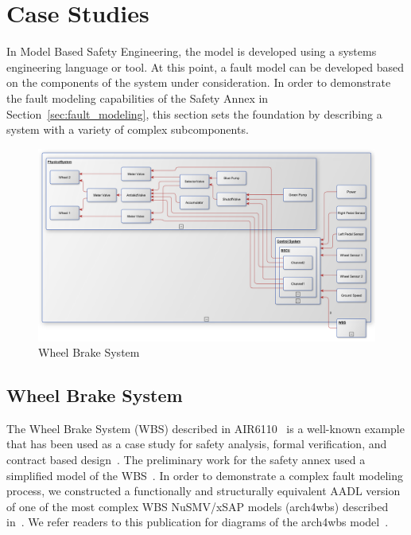  \section{Case Studies}
\label{sec:case_study} 
In Model Based Safety Engineering, the model is developed using a systems engineering language or tool. At this point, a fault model can be developed based on the components of the system under consideration. In order to demonstrate the fault modeling capabilities of the Safety Annex in Section~\ref{sec:fault_modeling}, this section sets the foundation by describing a system with a variety of complex subcomponents. 

\begin{figure}[h!]
	\centering
	\includegraphics[trim=0 9 0 5,clip,width=\textwidth]{images/wbs_arch.pdf}
	\caption{Wheel Brake System}
	\label{fig:wbs}
\end{figure} 

\subsection{Wheel Brake System}
The Wheel Brake System (WBS) described in AIR6110~\cite{AIR6110} is a well-known example that has been used as a case study for safety analysis, formal verification, and contract based design~\cite{DBLP:conf/cav/BozzanoCPJKPRT15, 10.1007/978-3-319-11936-6-7, CAV2015:BoCiGrMa, Joshi05:SafeComp}. The preliminary work for the safety annex used a simplified model of the WBS~\cite{Stewart17:IMBSA}. In order to demonstrate a complex fault modeling process, we constructed a functionally and structurally equivalent AADL version of one of the most complex WBS NuSMV/xSAP models (arch4wbs) described in~\cite{DBLP:conf/cav/BozzanoCPJKPRT15}. We refer readers to this publication for diagrams of the arch4wbs model~\cite{DBLP:conf/cav/BozzanoCPJKPRT15}.   

